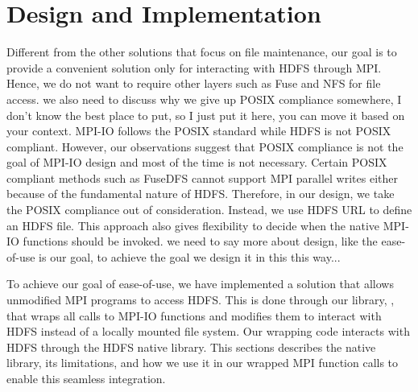 

\section{Design and Implementation}
\label{sec:impl}
Different from the other solutions that focus on file maintenance, our goal is
to provide a convenient solution only for
interacting with HDFS through MPI. Hence, we do not want to require other layers such as
Fuse and NFS for file access. {\color{red} we also need to discuss why we give up
POSIX compliance somewhere, I don't know the best place to put, so I just put it
here, you can move it based on your context.} MPI-IO follows the POSIX standard
while HDFS is not POSIX compliant. However, our observations suggest that POSIX
compliance is not the goal of MPI-IO design and most of the time is not
necessary. Certain POSIX compliant methods such as
FuseDFS cannot support MPI parallel writes either because of the fundamental
nature of HDFS. Therefore, in our design, we take the POSIX compliance out of
consideration. Instead, we use HDFS URL to define an HDFS file. This approach
also gives {\proj} flexibility to decide when the native MPI-IO functions should
be invoked. {\color{red} we need to say more about design, like the ease-of-use
is our goal, to achieve the goal we design it in this this way...}

To achieve our goal of ease-of-use, we have implemented a solution that allows unmodified
MPI programs to access HDFS. This is done through our library, {\proj}, that
wraps all calls to MPI-IO
functions and modifies them to interact with HDFS instead of a locally mounted
file system. Our wrapping code interacts with HDFS through the HDFS native
library. This sections describes the native library, its limitations, and how we
use it in our wrapped MPI function calls to enable this seamless integration.

